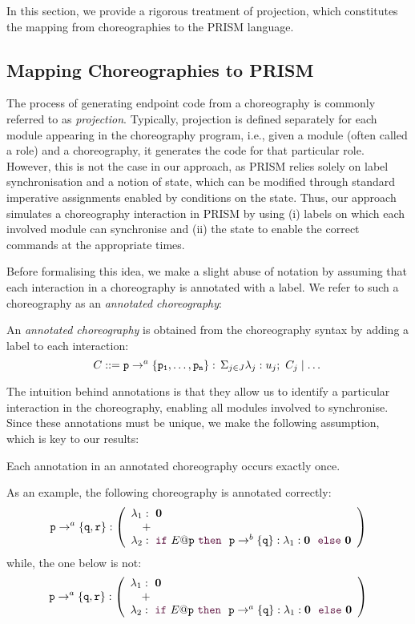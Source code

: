 In this section, we provide a rigorous treatment of projection, which
constitutes the mapping from choreographies to the PRISM language.
%

\subsection{Mapping Choreographies to PRISM} 
%
The process of generating endpoint code from a choreography is
commonly referred to as {\em projection}.  Typically, projection is
defined separately for each module appearing in the choreography
program, i.e., given a module (often called a role) and a
choreography, it generates the code for that particular role.
However, this is not the case in our approach, as PRISM relies solely
on label synchronisation and a notion of state, which can be modified
through standard imperative assignments enabled by conditions on the
state.
%
Thus, our approach simulates a choreography interaction in PRISM by
using (i) labels on which each involved module can synchronise and
(ii) the state to enable the correct commands at the appropriate
times.

Before formalising this idea, we make a slight abuse of notation by
assuming that each interaction in a choreography is annotated with a
label. We refer to such a choreography as an {\em annotated
  choreography}:
%
\begin{definition}
  An \emph{annotated choreography} is obtained from the choreography
  syntax by adding a label to each interaction:
  \[C ::= \mathtt{p}\rightarrow^{a} \{\mathtt{\mathtt{p}_1,\ldots,\mathtt{p}_n}\}:\,\Sigma_{j\in J}\lambda_j: u_j;\ C_j \mid\dots\]
\end{definition}
%
The intuition behind annotations is that they allow us to identify a
particular interaction in the choreography, enabling all modules
involved to synchronise. Since these annotations must be unique, we
make the following assumption, which is key to our results:
\begin{assumption}
  Each annotation in an annotated choreography occurs exactly once.
\end{assumption}
As an example, the following choreography is annotated correctly:
% 
\[
  \interactBasel{p}a{q,r}:
  \left(
    \begin{array}{ll}
      \lambda_1: \ \CEnd \\
      \quad+\\
      \lambda_2:\
      \ifTE {E}{p}{\ \interactBasel{p}b{q}: \lambda_1: \CEnd\ }{\CEnd}
    \end{array}
  \right)
\]
while, the one below is not: 
% 
\[
  \interactBasel{p}a{q,r}:
  \left(
    \begin{array}{ll}
      \lambda_1: \ \CEnd \\
      \quad+\\
      \lambda_2:\
      \ifTE {E}{p}{\ \interactBasel{p}a{q}: \lambda_1: \CEnd\ }{\CEnd}
    \end{array}
  \right)
\]
% 

